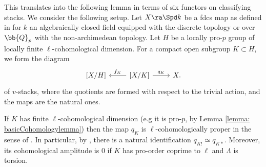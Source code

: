 \documentclass[letterpaper,11pt]{amsart}
\begin{document}
This translates into the following lemma in terms of six functors on classifying stacks. We consider the following setup. Let $X \ra \Spd k$ be a fdcs map as defined in \cite[Definition~5.4]{Mann2022NuclearSheaves} for $k$ an algebraically closed field equipped with the discrete topology or over $\bb{Q}_{p}$  with the non-archimedean topology. Let $H$ be a locally pro-$p$ group of locally finite $\ell$-cohomological dimension. For a compact open subgroup $K \subset H$, we form the diagram 
\[ 
\begin{tikzcd}
    \left[X/H\right] & \left[X/K\right]\ar[l,"{f_{K}}",swap] \ar[r,"{q_{K}}", left] & X.
\end{tikzcd} \]
of $v$-stacks, where the quotients are formed with respect to the trivial action, and the maps are the natural ones. 
\begin{lemma}{\label{lemma: classifiyingstackmapproperties}}
If $K$ has finite $\ell$-cohomological dimension (e.g it is pro-$p$, by Lemma \ref{lemma: basicCohomologylemma}) then the map $q_{K}$ is $\ell$-cohomologically proper in the sense of \cite[Definition~9.5]{Mann2022NuclearSheaves}. In particular, by \cite[Proposition~9.7]{Mann2022NuclearSheaves}, there is a natural identification $q_{K!} \simeq q_{K*}$. Moreover, its cohomological amplitude is $0$ if $K$ has pro-order coprime to $\ell$ and $\Lambda$ is torsion. 
\end{lemma}
\end{document}
